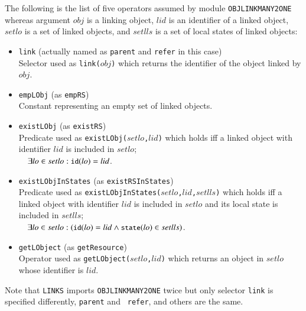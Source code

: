 \documentclass[12pt]{report}
\newcommand{\mbstt}[1]{\mbox{\small{\tt {#1}}}}
\newcommand{\stt}[1]{{\small{\tt {#1}}}}
\begin{document}
The following is the list of five operators assumed by
module {\tt OBJLINKMANY2ONE} whereas argument $obj$ is a linking
object, $lid$ is an identifier of a linked object, $setlo$ is a set of
linked objects, and $setlls$ is a set of local states of linked
objects:
\begin{itemize}
\item \stt{link} (actually named as \stt{parent} and \stt{refer} in this case)\\
  Selector used as \stt{link($obj$)} which returns the identifier of
  the object linked by $obj$.
\item \stt{empLObj} (as \stt{empRS})\\
  Constant representing an empty set of linked objects.
\item \stt{existLObj} (as \stt{existRS})\\
  Predicate used as \stt{existLObj($setlo$,$lid$)} which holds iff a
  linked object with identifier $lid$ is included in
  $setlo$;\\$~~~~\exists lo\in setlo:\mbstt{id}(lo)=lid$.
\item \stt{existLObjInStates} (as \stt{existRSInStates})\\
  Predicate used as \stt{existLObjInStates($setlo$,$lid$,$setlls$)}
  which holds iff a linked object with identifier $lid$ is included
  in $setlo$ and its local state is included in
  $setlls$;\\$~~~~\exists lo\in setlo:(\mbstt{id}(lo)=lid\land
  \mbstt{state}(lo)\in setlls)$.
\item \stt{getLObject} (as \stt{getResource})\\
  Operator used as \stt{getLObject($setlo$,$lid$)} which returns an
  object in $setlo$ whose identifier is $lid$.
\end{itemize}
Note that {\tt LINKS} imports {\tt OBJLINKMANY2ONE} twice but only
selector {\tt link} is specified differently, {\tt parent} and {\tt
  refer}, and others are the same.
\end{document}
